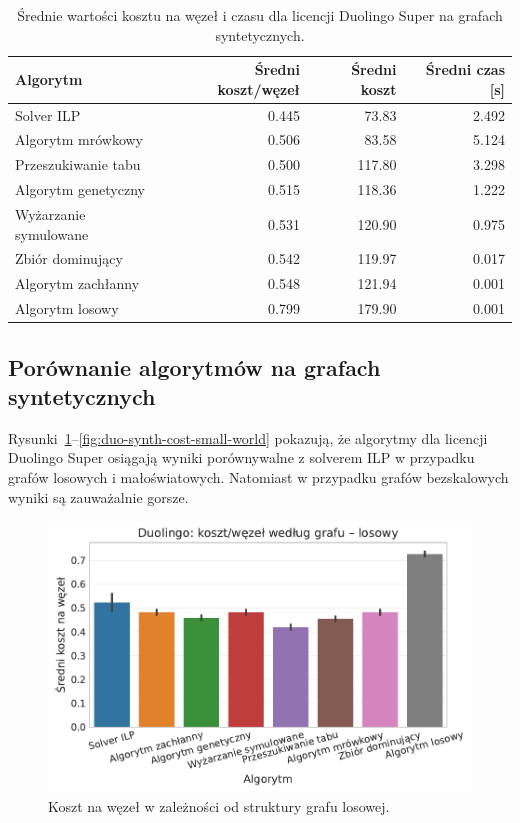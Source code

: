 \begin{table}[H]
  \centering
  \caption{Średnie wartości kosztu na węzeł i czasu dla licencji Duolingo Super na grafach syntetycznych.}
  \label{tab:duo-synth-summary}
  \begin{tabular}{lrrr}
    \toprule
    \textbf{Algorytm}     & \textbf{Średni koszt/węzeł} & \textbf{Średni koszt} & \textbf{Średni czas [s]} \\
    \midrule
    Solver ILP            & 0.445                       & 73.83                 & 2.492                    \\
    Algorytm mrówkowy     & 0.506                       & 83.58                 & 5.124                    \\
    Przeszukiwanie tabu   & 0.500                       & 117.80                & 3.298                    \\
    Algorytm genetyczny   & 0.515                       & 118.36                & 1.222                    \\
    Wyżarzanie symulowane & 0.531                       & 120.90                & 0.975                    \\
    Zbiór dominujący      & 0.542                       & 119.97                & 0.017                    \\
    Algorytm zachłanny    & 0.548                       & 121.94                & 0.001                    \\
    Algorytm losowy       & 0.799                       & 179.90                & 0.001                    \\
    \bottomrule
  \end{tabular}
\end{table}


\subsection{Porównanie algorytmów na grafach syntetycznych}

Rysunki~\ref{fig:duo-synth-cost-random}--\ref{fig:duo-synth-cost-small-world} pokazują, że algorytmy dla licencji Duolingo Super osiągają wyniki porównywalne z solverem ILP w przypadku grafów losowych i małoświatowych. Natomiast w przypadku grafów bezskalowych wyniki są zauważalnie gorsze.


\begin{figure}[H]
  \centering
  \includegraphics[width=0.65\linewidth]{assets/figures/benchmark/synthetic/duolingo_cost_per_node_by_graph_random.pdf}
  \caption{Koszt na węzeł w zależności od struktury grafu losowej.}
  \label{fig:duo-synth-cost-random}
\end{figure}

